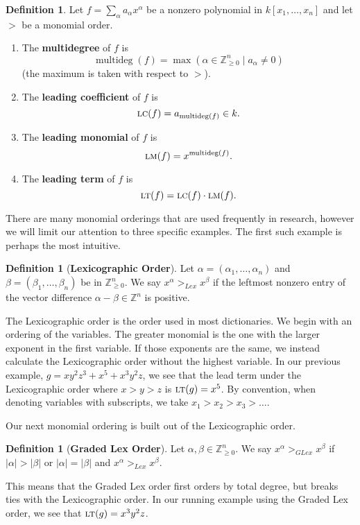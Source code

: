 \documentclass[MS, xcolor=dvipsnames]{wfuthesis}
\def\bZ{\mathbb{Z}}
\newcommand{\LT}{\ensuremath{\text{\sc lt}}}
\newcommand{\LM}{\ensuremath{\text{\sc lm}}}
\newcommand{\LC}{\ensuremath{\text{\sc lc}}}
\DeclareMathOperator{\multideg}{multideg}
\theoremstyle{definition}
\newtheorem{definition}[theorem]{Definition}
\begin{document}
\begin{definition}
  Let $f = \sum_\alpha a_\alpha x^\alpha$ be a nonzero polynomial in $k[x_1,\dots,x_n]$ and let $>$ be a monomial order.
  \begin{enumerate}[label=(\roman*)]
    \item The \textbf{multidegree} of $f$ is 
    \[ \multideg(f) = \max(\alpha \in \bZ_{\ge0}^n \mid a_\alpha \ne 0) \]
    (the maximum is taken with respect to $>$).
    \item The \textbf{leading coefficient} of $f$ is
    \[ \LC(f) = a_{\multideg(f)} \in k. \]
    \item The \textbf{leading monomial} of $f$ is
    \[ \LM(f) = x^{\multideg(f)}. \]
    \item The \textbf{leading term} of $f$ is
    \[ \LT(f) = \LC(f) \cdot \LM(f). \]
  \end{enumerate}
\end{definition}
There are many monomial orderings that are used frequently in research, however we will limit our attention to three specific examples. The first such example is perhaps the most intuitive. 
\begin{definition}[\bf Lexicographic Order]
  Let $\alpha = (\alpha_1, \dots, \alpha_n)$ and $\beta = (\beta_1,\dots,\beta_n)$ be in $\bZ_{\ge0}^n$. We say $x^\alpha >_{Lex} x^\beta$ if the leftmost nonzero entry of the vector difference $\alpha - \beta \in \bZ^n$ is positive. 
\end{definition}
The Lexicographic order is the order used in most dictionaries. We begin with an ordering of the variables. The greater monomial is the one with the larger exponent in the first variable. If those exponents are the same, we instead calculate the Lexicographic order without the highest variable. In our previous example, $g = xy^2z^3 + x^5 + x^3y^2z$, we see that the lead term under the Lexicographic order where $x>y>z$ is $\LT(g)=x^5$. By convention, when denoting variables with subscripts, we take $x_1 > x_2 > x_3 > \dots$. \par 
Our next monomial ordering is built out of the Lexicographic order. 
\begin{definition}[\bf Graded Lex Order]
  Let $\alpha,\beta \in \bZ_{\ge0}^n$. We say $x^\alpha >_{GLex} x^\beta$ if $|\alpha| > |\beta|$ or $|\alpha|=|\beta|$ and $x^\alpha >_{Lex} x^\beta$. 
\end{definition}
This means that the Graded Lex order first orders by total degree, but breaks ties with the Lexicographic order. In our running example using the Graded Lex order, we see that $\LT(g)=x^3y^2z$. \par 
\end{document}
